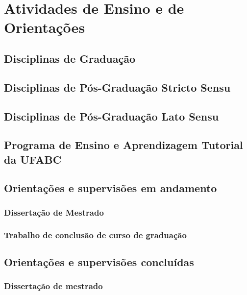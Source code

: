 

\chapter{Atividades de Ensino e de Orientações}\label{cap:ensino}

\lipsum[81]

\section{Disciplinas de Graduação}

\section{Disciplinas de Pós-Graduação Stricto Sensu}

\section{Disciplinas de Pós-Graduação Lato Sensu}

\section{Programa de Ensino e Aprendizagem Tutorial da UFABC}

\section{Orientações e supervisões em andamento}

\subsection{Dissertação de Mestrado}



\subsection{Trabalho de conclusão de curso de graduação}



\section{Orientações e supervisões concluídas}

\subsection{Dissertação de mestrado}

